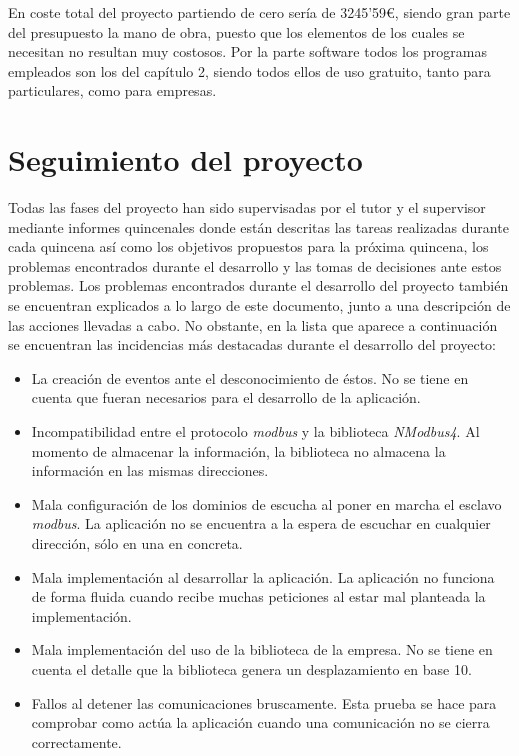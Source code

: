 \documentclass[pdftex,11pt,a4paper]{book}
\begin{document}
En coste total del proyecto partiendo de cero sería de 3245'59\euro, siendo gran parte del presupuesto la mano de obra, puesto que los elementos de los cuales se necesitan no resultan muy costosos. Por la parte software todos los programas empleados son los del capítulo 2, siendo todos ellos de uso gratuito, tanto para particulares, como para empresas.


\section{Seguimiento del proyecto}

Todas las fases del proyecto han sido supervisadas por el tutor y el supervisor mediante informes quincenales donde están descritas las tareas realizadas durante cada quincena así como los objetivos propuestos para la próxima quincena, los problemas encontrados durante el desarrollo y las tomas de decisiones ante estos problemas. Los problemas encontrados durante el desarrollo del proyecto también se encuentran explicados a lo largo de este documento, junto a una descripción de las acciones llevadas a cabo. No obstante, en la lista que aparece a continuación se encuentran las incidencias más destacadas durante el desarrollo del proyecto:

\begin{itemize}
\item La creación de eventos ante el desconocimiento de éstos. No se tiene en cuenta que fueran necesarios para el desarrollo de la aplicación.
\item Incompatibilidad entre el protocolo \emph{modbus} y la biblioteca \emph{NModbus4}. Al momento de almacenar la información, la biblioteca no almacena la información en las mismas direcciones.
\item Mala configuración de los dominios de escucha al poner en marcha el esclavo \emph{modbus}. La aplicación no se encuentra a la espera de escuchar en cualquier dirección, sólo en una en concreta.
\item Mala implementación al desarrollar la aplicación. La aplicación no funciona de forma fluida cuando recibe muchas peticiones al estar mal planteada la implementación.
\item Mala implementación del uso de la biblioteca de la empresa. No se tiene en cuenta el detalle que la biblioteca genera un desplazamiento en base 10.
\item Fallos al detener las comunicaciones bruscamente. Esta prueba se hace para comprobar como actúa la aplicación cuando una comunicación no se cierra correctamente.
\end{itemize}
\end{document}
